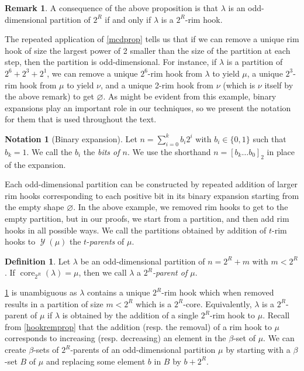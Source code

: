 \documentclass[12pt]{amsart}
\theoremstyle{definition}
\newtheorem{definition}[theorem]{Definition}
\newtheorem{notation}[theorem]{Notation}
\newtheorem{remark}[theorem]{Remark}
\numberwithin{equation}{section}
\DeclareMathOperator{\sh}{\mathcal{Y}}
\newcommand{\la}{\lambda}
\DeclareMathOperator{\core}{{core}}
\begin{document}
\begin{remark}\label{odd-partitions-are-hooks}
    A consequence of the above proposition is that $\la$ is an odd-dimensional partition of $2^R$ if and only if $\la$ is a $2^R$-rim hook.
\end{remark}
The repeated application of \cref{mcdprop} tells us that if we can remove a unique rim hook of size the largest power of 2 smaller than the size of the partition at each step, then the partition is odd-dimensional. For instance, if $\la$ is a partition of $2^{6} + 2^{3} + 2^1$, we can remove a unique $2^6$-rim hook from $\la$ to yield $\mu$, a unique $2^3$-rim hook from $\mu$ to yield $\nu$, and a unique 2-rim hook from $\nu$ (which is $\nu$ itself by the above remark) to get $\varnothing$. As might be evident from this example, binary expansions play an important role in our techniques, so we present the notation for them that is used throughout the text.
\begin{notation}[Binary expansion]\label{not:binary} Let $n = \sum\limits_{i=0}^k b_i 2^i$ with $b_i \in \{0,1\}$ such that $b_k = 1$. We call the $b_i$  the \textit{bits of $n$}. We use the shorthand $n = [b_k\ldots b_0]_2$ in place of the expansion.
\end{notation}
Each odd-dimensional partition can be constructed by repeated addition of larger rim hooks corresponding to each positive bit in its binary expansion starting from the empty shape $\varnothing$. In the above example, we removed rim hooks to get to the empty partition, but in our proofs, we start from a partition, and then add rim hooks in all possible ways. We call the partitions obtained by addition of $t$-rim hooks to $\sh(\mu)$ the $t$-\textit{parents} of $\mu$.
\begin{definition}\label{parentsrem}
Let $\lambda$ be an odd-dimensional partition of $n = 2^R + m$ with $m < 2^R$. If $\core_{2^R}(\lambda) = \mu$, then we call $\lambda$ a \textit{$2^R$-parent of $\mu$}. 
\end{definition}
\cref{parentsrem} is unambiguous as $\lambda$ contains a unique $2^R$-rim hook which when removed results in a partition of size $m < 2^R$ which is a $2^R$-core. Equivalently, $\la$ is a $2^R$-parent of $\mu$ if $\la$ is obtained by the addition of a single $2^R$-rim hook to $\mu$.  Recall from \cref{hookremprop} that the addition (resp. the removal) of a rim hook to $\mu$ corresponds to increasing (resp. decreasing) an element in the $\beta$-set of $\mu$. We can create $\beta$-sets of $2^R$-parents of an odd-dimensional partition $\mu$ by starting with a $\beta$-set $B$ of $\mu$ and replacing some element $b$ in $B$ by $b+2^R$. 
\end{document}
